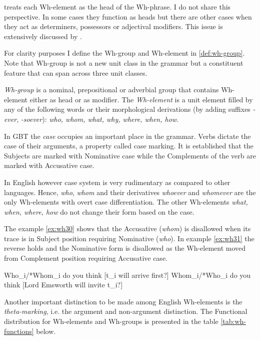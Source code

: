 \citet[p.~375]{Haegeman1991} treats each Wh-element as the head of the Wh-phrase. I do not share this perspective. In some cases they function as heads but there are other cases when they act as determiners, possessors or adjectival modifiers. This issue is extensively discussed by \citet{Abney1987,Quirk1985,Halliday2013}. 

For clarity purposes I define the Wh-group and Wh-element in \ref{def:wh-group}. Note that Wh-group is not a new unit class in the grammar but a constituent feature that can span across three unit classes.

\begin{definition}\label{def:wh-group}
	\textit{Wh-group} is a nominal, prepositional or adverbial group that contains Wh-element either as head or as modifier. The \textit{Wh-element} is a unit element filled by any of the following words or their morphological derivations (by adding suffixes \textit{-ever}, \textit{-soever}): \textit{who, whom, what, why, where, when, how}.
\end{definition}

In GBT the \textit{case} occupies an important place in the grammar. Verbs dictate the case of their arguments, a property called case marking. It is established that the Subjects are marked with Nominative case while the Complements of the verb are marked with Accusative case. 

In English however case system is very rudimentary as compared to other languages.
Hence, \textit{who}, \textit{whom} and their derivatives \textit{whoever} and \textit{whomever} are the only Wh-elements with overt case differentiation. The other Wh-elements \textit{what, when, where, how} do not change their form based on the case. 

The example \ref{ex:wh30} shows that the Accusative (\textit{whom}) is disallowed when its trace is in Subject position requiring Nominative (\textit{who}). In example \ref{ex:wh31} the reverse holds and the Nominative form is disallowed as the Wh-element moved from Complement position requiring Accusative case. 

\begin{exe}
	\ex\label{ex:wh30} Who_{i}/*Whom_{i} do you think [t_{i} will arrive first?]
	\ex\label{ex:wh31} Whom_{i}/*Who_{i} do you think [Lord Emsworth will invite t_{i}?]
\end{exe}

Another important distinction to be made among English Wh-elements is the \textit{theta-marking}, i.e. the argument and non-argument distinction. The Functional distribution for Wh-elements and Wh-groups is presented in the table \ref{tab:wh-functions} below.

